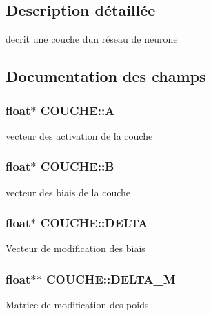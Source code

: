 \subsection{Description détaillée}
decrit une couche d\textquotesingle{}un réseau de neurone 

\subsection{Documentation des champs}
\subsubsection[{\texorpdfstring{A}{A}}]{\setlength{\rightskip}{0pt plus 5cm}float$\ast$ C\+O\+U\+C\+H\+E\+::A}\hypertarget{structCOUCHE_a2218fee1751e9b8b7355ebe577938f8a}{}\label{structCOUCHE_a2218fee1751e9b8b7355ebe577938f8a}
vecteur des activation de la couche 
\subsubsection[{\texorpdfstring{B}{B}}]{\setlength{\rightskip}{0pt plus 5cm}float$\ast$ C\+O\+U\+C\+H\+E\+::B}\hypertarget{structCOUCHE_ae39541beb5026e0dc23b79066d841d8a}{}\label{structCOUCHE_ae39541beb5026e0dc23b79066d841d8a}
vecteur des biais de la couche 
\subsubsection[{\texorpdfstring{D\+E\+L\+TA}{DELTA}}]{\setlength{\rightskip}{0pt plus 5cm}float$\ast$ C\+O\+U\+C\+H\+E\+::\+D\+E\+L\+TA}\hypertarget{structCOUCHE_a091237265ad9fafe21bad7b8a9cb41e1}{}\label{structCOUCHE_a091237265ad9fafe21bad7b8a9cb41e1}
Vecteur de modification des biais 
\subsubsection[{\texorpdfstring{D\+E\+L\+T\+A\+\_\+M}{DELTA_M}}]{\setlength{\rightskip}{0pt plus 5cm}float$\ast$$\ast$ C\+O\+U\+C\+H\+E\+::\+D\+E\+L\+T\+A\+\_\+M}\hypertarget{structCOUCHE_ac28815a9c587cba7def4901a7bcfd244}{}\label{structCOUCHE_ac28815a9c587cba7def4901a7bcfd244}
Matrice de modification des poids 
